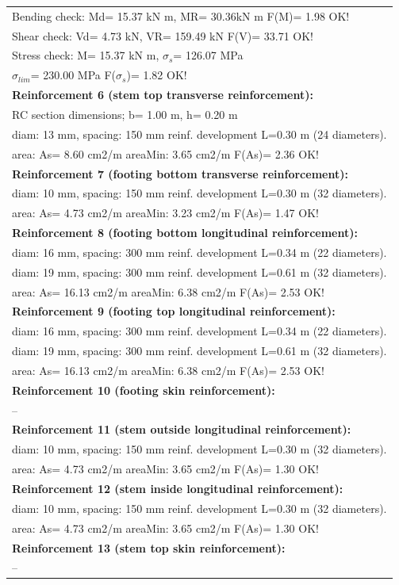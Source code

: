\begin{center}
\begin{supertabular}[H]{|l|}
  Bending check: Md=  15.37 kN m, MR=  30.36kN m  F(M)= 1.98 OK!\\
  Shear check: Vd=   4.73 kN,  VR= 159.49 kN  F(V)= 33.71 OK!\\
  Stress check: M=  15.37 kN m, $\sigma_s$= 126.07 MPa\\
    $\sigma_{lim}$= 230.00 MPa  F($\sigma_s$)= 1.82 OK!\\
\textbf{Reinforcement 6 (stem top transverse reinforcement):}\\
  RC section dimensions; b= 1.00 m, h= 0.20 m\\
  diam: 13 mm, spacing: 150 mm  reinf. development L=0.30 m (24 diameters).\\
  area: As=   8.60 cm2/m areaMin:   3.65 cm2/m  F(As)= 2.36 OK!\\
\textbf{Reinforcement 7 (footing bottom transverse reinforcement):}\\
  diam: 10 mm, spacing: 150 mm  reinf. development L=0.30 m (32 diameters).\\
  area: As=   4.73 cm2/m areaMin:   3.23 cm2/m  F(As)= 1.47 OK!\\
\textbf{Reinforcement 8 (footing bottom longitudinal reinforcement):}\\
  diam: 16 mm, spacing: 300 mm  reinf. development L=0.34 m (22 diameters).\\
  diam: 19 mm, spacing: 300 mm  reinf. development L=0.61 m (32 diameters).\\
  area: As=  16.13 cm2/m areaMin:   6.38 cm2/m  F(As)= 2.53 OK!\\
\textbf{Reinforcement 9 (footing top longitudinal reinforcement):}\\
  diam: 16 mm, spacing: 300 mm  reinf. development L=0.34 m (22 diameters).\\
  diam: 19 mm, spacing: 300 mm  reinf. development L=0.61 m (32 diameters).\\
  area: As=  16.13 cm2/m areaMin:   6.38 cm2/m  F(As)= 2.53 OK!\\
\textbf{Reinforcement 10 (footing skin reinforcement):}\\
  --\\
\textbf{Reinforcement 11 (stem outside longitudinal reinforcement):}\\
  diam: 10 mm, spacing: 150 mm  reinf. development L=0.30 m (32 diameters).\\
  area: As=   4.73 cm2/m areaMin:   3.65 cm2/m  F(As)= 1.30 OK!\\
\textbf{Reinforcement 12 (stem inside longitudinal reinforcement):}\\
  diam: 10 mm, spacing: 150 mm  reinf. development L=0.30 m (32 diameters).\\
  area: As=   4.73 cm2/m areaMin:   3.65 cm2/m  F(As)= 1.30 OK!\\
\textbf{Reinforcement 13 (stem top skin reinforcement):}\\
  --\\
\hline
\end{supertabular}
\end{center}

